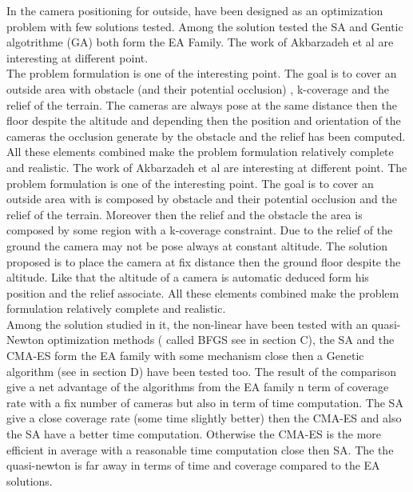 In \cite{141*akbarzadeh2013} the camera positioning for outside, have been designed as an optimization problem with few solutions tested. Among the solution tested the SA and Gentic algotrithme (GA) both form the EA Family. 
The work of Akbarzadeh et al \cite{141*akbarzadeh2013} are interesting at different point. \\
The problem formulation is one of the interesting point. The goal is to cover an outside area with obstacle (and their potential occlusion) , k-coverage and the relief of the terrain. The cameras are always pose at the same distance then the floor despite the altitude and depending then the position  and orientation of the cameras the  occlusion generate by the obstacle and the relief has been computed. All these elements combined make the problem formulation relatively complete and realistic.
The work of Akbarzadeh et al \cite{141*akbarzadeh2013} are interesting at different point. 
The problem formulation is one of the interesting point. The goal is to cover an outside area with is composed by obstacle and their potential occlusion and the relief of the terrain. Moreover then the relief and the obstacle the area is composed by some region with a k-coverage constraint. 
Due to the relief of the ground the camera may not be pose  always  at constant altitude. The solution proposed is to  place the  camera at fix distance then the ground floor despite the altitude. Like that the altitude of a camera is automatic deduced form his position and the relief associate.  
  All these elements combined make the problem formulation relatively complete and realistic.\\
 Among the solution studied in it, the non-linear have been tested with an quasi-Newton optimization methods ( called BFGS see in \cite{141*akbarzadeh2013} section C), the SA and the CMA-ES  form the EA family with some mechanism close then a Genetic algorithm (see in \cite{141*akbarzadeh2013} section D) have been tested too.
The result of the comparison give a net advantage of the algorithms from the EA family  n term of   coverage rate with a fix number of cameras but also in term of time computation. 
 The SA give a close coverage rate (some time slightly better) then the CMA-ES and also the SA have a better time computation. Otherwise the CMA-ES is the more efficient in average with a reasonable time computation close then SA. The the quasi-newton is far away in terms of time and coverage compared to the EA solutions.\\
 
